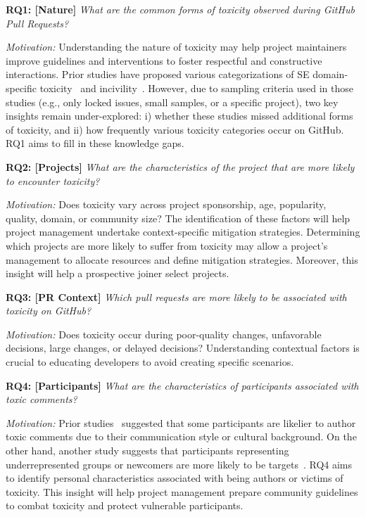 \vspace{2pt}
\noindent \textbf{RQ1:  [Nature]} \textit{What are the common forms of toxicity observed during GitHub Pull Requests?}

\textit{Motivation:} 
Understanding the nature of toxicity may help project maintainers improve guidelines and interventions to foster respectful and constructive interactions. Prior studies have proposed various categorizations of SE domain-specific toxicity~\cite{miller2022did, sarker2022automated} and incivility~\cite{ferreira2021shut}. However, due to sampling criteria used in those studies (e.g., only locked issues, small samples, or a specific project), two key insights remain under-explored: i) whether these studies missed additional forms of toxicity, and ii) how frequently various toxicity categories occur on GitHub. RQ1 aims to fill in these knowledge gaps.


\vspace{2pt}
\noindent  \textbf{RQ2: [Projects]} \textit{What are the characteristics of the project that are more likely to encounter toxicity?}

\textit{Motivation:}  Does toxicity vary across project sponsorship, age,  popularity, quality, domain, or community size?  The identification of these factors will help project management undertake context-specific mitigation strategies. Determining which projects are more likely to suffer from toxicity may allow a project's management to allocate resources and define mitigation strategies.  Moreover, this insight will help a prospective joiner select projects.
 


\vspace{2pt}
\noindent \textbf{RQ3: [PR Context]} \textit{Which pull requests are more likely to be associated with toxicity on GitHub?}

\textit{Motivation:}
Does toxicity occur during poor-quality changes, unfavorable decisions, large changes, or delayed decisions?
Understanding contextual factors is crucial to educating developers to avoid creating specific scenarios. 



\vspace{2pt}
\noindent \textbf{RQ4: [Participants] } \textit{What are the characteristics of participants associated with toxic comments?}


\textit{Motivation:}
Prior studies~\cite{miller2022did,ferreira2021shut} suggested that some participants are likelier to author toxic comments due to their communication style or cultural background. On the other hand, another study suggests that participants representing underrepresented groups or newcomers are more likely to be targets~\cite{murphy2022pushback}. RQ4 aims to identify personal characteristics associated with being authors or victims of toxicity. This insight will help project management prepare community guidelines to combat toxicity and protect vulnerable participants.


